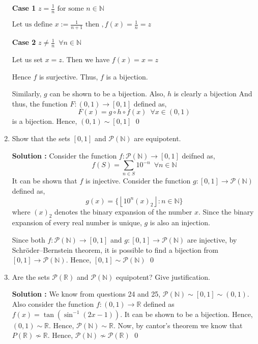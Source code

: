 \documentclass[10pt]{article}
\newcommand{\nn}{\mathbb{N}}
\newcommand{\rn}{\mathbb{R}}
\newcommand{\p}{\mathcal{P}}
\begin{document}
\begin{enumerate}
    \textbf{Case 1} $z = \frac{1}{n} \text{ for some } n \in \nn$

        $\text{Let us define }x := \frac{1}{n + 1} \text{ then }, f(x) = \frac{1}{n} = z$

    \textbf{Case 2} $z \neq \frac{1}{n} \,\,\,\forall n \in \nn$

        Let us set $x = z$. Then we have $f(x) = x = z$

    Hence $f$ is surjective. Thus, $f$ is a bijection.
    
    Similarly, $g$ can be shown to be a bijection. Also, $h$ is clearly a bijection And thus, the function $F : (0, 1) \to [0, 1]$ defined as, $$F(x) = g\circ h\circ f(x) \, \, \, \forall x \in (0,1)$$ is a bijection. Hence, $(0,1) \sim [0, 1]$ \qed
    \item Show that the sets $[0, 1]$ and $\p(\nn)$ are equipotent.

	    \textbf{Solution : }Consider the function $f : \p(\nn) \to [0,1]$ deifned as, 
	    $$f(S) = \sum_{n\in S} 10^{-n} \,\,\, \forall n \in \nn$$ It can be shown that $f$ is injective. 
	    Consider the function $g: [0, 1] \to \p(\nn)$ defined as, 
	    $$g(x) = \{\left \lfloor 10^n(x)_2 \right \rfloor : n \in \nn \}$$ 
	    where $(x)_2$ denotes the binary expansion of the number $x$.
	    Since the binary expansion of every real number is unique, $g$ is also an injection. 

	    Since both $f: \p(\nn) \to [0,1]$ and $g: [0,1] \to \p(\nn)$ are injective, by Schröder–Bernstein theorem, it is possible to find
	    a bijection from $[0, 1] \to \p(\nn)$. Hence, $[0, 1] \sim \p(\nn)$ \qed
	    
    \item Are the sets $\p(\rn)$ and $\p(\nn)$ equipotent? Give justification. 

    \textbf{Solution : }We know from questions 24 and 25, $\p(\nn) \sim [0, 1] \sim (0, 1)$.
    Also consider the function $f : (0, 1) \to \rn$ defined as $f(x) = \tan(\sin^{-1}(2x - 1))$. It can be shown to be a bijection. Hence, $(0, 1) \sim \rn$. Hence, $\p(\nn) \sim \rn$. Now, by cantor's theorem we know that $P(\rn) \not \sim \rn$. Hence, $\p(\nn) \not\sim \p(\rn)$ \qed
\end{enumerate}
\end{document}
